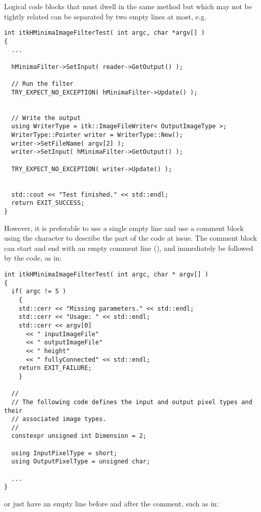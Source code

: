 Logical code blocks that must dwell in the same method but which may not be
tightly related can be separated by two empty lines at most, e.g.

\small
\begin{verbatim}
int itkHMinimaImageFilterTest( int argc, char *argv[] )
{
  ...

  hMinimaFilter->SetInput( reader->GetOutput() );

  // Run the filter
  TRY_EXPECT_NO_EXCEPTION( hMinimaFilter->Update() );


  // Write the output
  using WriterType = itk::ImageFileWriter< OutputImageType >;
  WriterType::Pointer writer = WriterType::New();
  writer->SetFileName( argv[2] );
  writer->SetInput( hMinimaFilter->GetOutput() );

  TRY_EXPECT_NO_EXCEPTION( writer->Update() );


  std::cout << "Test finished." << std::endl;
  return EXIT_SUCCESS;
}
\end{verbatim}
\normalsize


However, it is preferable to use a single empty line and use a comment block
using the \code{//} character to describe the part of the code at issue. The
comment block can start and end with an empty comment line (\code{//}), and
immediately be followed by the code, as in:

\small
\begin{verbatim}
int itkHMinimaImageFilterTest( int argc, char * argv[] )
{
  if( argc != 5 )
    {
    std::cerr << "Missing parameters." << std::endl;
    std::cerr << "Usage: " << std::endl;
    std::cerr << argv[0]
      << " inputImageFile"
      << " outputImageFile"
      << " height"
      << " fullyConnected" << std::endl;
    return EXIT_FAILURE;
    }

  //
  // The following code defines the input and output pixel types and their
  // associated image types.
  //
  constexpr unsigned int Dimension = 2;

  using InputPixelType = short;
  using OutputPixelType = unsigned char;

  ...
}
\end{verbatim}
\normalsize

or just have an empty line before and after the comment, such as in:

